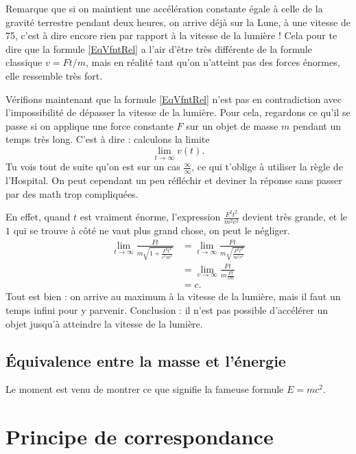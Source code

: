 Remarque que si on maintient une accélération constante égale à celle de la gravité terrestre pendant deux heures, on arrive déjà sur la Lune, à une vitesse de \unit{75}{\kilo\meter\per\second}, c'est à dire encore rien par rapport à la vitesse de la lumière ! Cela pour te dire que la formule \eqref{EqVfntRel} a l'air d'être très différente de la formule classique $v=Ft/m$, mais en réalité tant qu'on n'atteint pas des forces énormes, elle ressemble très fort.

Vérifions maintenant que la formule \eqref{EqVfntRel} n'est pas en contradiction avec l'impossibilité de dépasser la vitesse de la lumière. Pour cela, regardons ce qu'il se passe si on applique une force constante $F$ sur un objet de masse $m$ pendant un temps très long. C'est à dire : calculons la limite
\[ 
  \lim_{t\to\infty}v(t).
\]
Tu vois tout de suite qu'on est sur un cas $\frac{ \infty }{ \infty }$, ce qui t'oblige à utiliser la règle de l'Hospital. On peut cependant un peu réfléchir et deviner la réponse sans passer par des math trop compliquées.

En effet, quand $t$ est vraiment énorme, l'expression $\frac{ F^2t^2 }{ m^2c^2 }$ devient très grande, et le $1$ qui se trouve à côté ne vaut plus grand chose, on peut le négliger.
\begin{equation}
\begin{split}
\lim_{t\to\infty}\frac{ Ft }{ m\sqrt{1+\frac{ F^2t^2 }{ c^2m^2 }} }&=\lim_{t\to\infty}\frac{ Ft }{ m\sqrt{\frac{ F^2t^2 }{ m^2c^2 }} }\\
		&=\lim_{v\to\infty}\frac{ Ft }{ m\frac{ Ft }{ cm } }\\
		&=c.
\end{split}
\end{equation}
Tout est bien : on arrive au maximum à la vitesse de la lumière, mais il faut un temps infini pour y parvenir. Conclusion : il n'est pas possible d'accélérer un objet jusqu'à atteindre la vitesse de la lumière.

\subsection{Équivalence entre la masse et l'énergie}

Le moment est venu de montrer ce que signifie la fameuse formule $E=mc^2$.

\section{Principe de correspondance}


